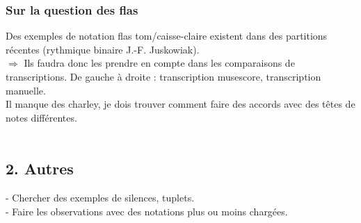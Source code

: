\subsubsection{Sur la question des flas}
Des exemples de notation flas tom/caisse-claire existent dans des partitions récentes (rythmique binaire J.-F. Juskowiak).\\
$\Rightarrow$ Ils faudra donc les prendre en compte dans les comparaisons de transcriptions.
De gauche à droite : transcription musescore, transcription manuelle.\\
Il manque des charley, je dois trouver comment faire des accords avec des têtes de notes différentes.\\\\
\subsection*{2. Autres}
- Chercher des exemples de silences, tuplets.\\
- Faire les observations avec des notations plus ou moins chargées.